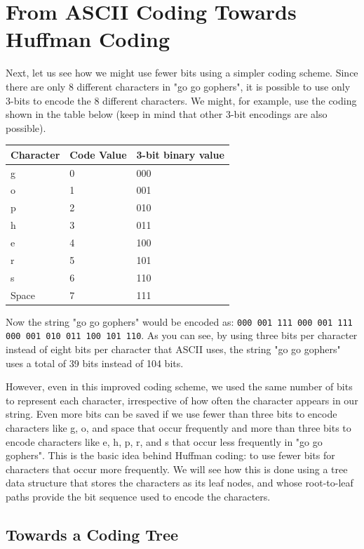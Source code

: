 \documentclass[11pt]{article}
\begin{document}
\section{From ASCII Coding Towards Huffman Coding}

Next, let us see how we might use fewer bits using a simpler coding
scheme.  Since there are only 8 different characters in "go go
gophers", it is possible to use only 3-bits to encode the 8 different
characters.  We might, for example, use the coding shown in the table
below (keep in mind that other 3-bit encodings are also possible).

\begin{tabular}{lll}
  \hline
  \textbf{Character} & \textbf{Code Value} & \textbf{3-bit binary value}\\
  \hline
  g & 0	& 000\\
  o & 1 & 001\\
  p & 2 & 010\\
  h & 3 & 011\\
  e & 4 & 100\\
  r & 5 & 101\\
  s & 6 & 110\\
  Space & 7 & 111\\
  \hline
\end{tabular}

Now the string "go go gophers" would be encoded as: \texttt{000 001
  111 000 001 111 000 001 010 011 100 101 110}.  As you can see, by
using three bits per character instead of eight bits per character
that ASCII uses, the string "go go gophers" uses a total of 39 bits
instead of 104 bits.
 
However, even in this improved coding scheme, we used the same number
of bits to represent each character, irrespective of how often the
character appears in our string.  Even more bits can be saved if we
use fewer than three bits to encode characters like g, o, and space
that occur frequently and more than three bits to encode characters
like e, h, p, r, and s that occur less frequently in "go go gophers".
This is the basic idea behind Huffman coding: to use fewer bits for
characters that occur more frequently.  We will see how this is done
using a tree data structure that stores the characters as its leaf
nodes, and whose root-to-leaf paths provide the bit sequence used to
encode the characters.

\subsection{Towards a Coding Tree}
\end{document}
